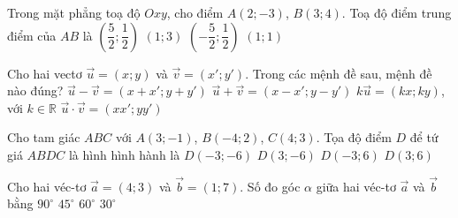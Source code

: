 \begin{ex}%
	Trong mặt phẳng toạ độ $Oxy$, cho điểm $A(2;-3)$, $B(3;4)$. Toạ độ điểm trung điểm của $AB$ là
	\choice
	{\True $\left(\dfrac{5}{2};\dfrac{1}{2}\right)$}
	{$(1;3)$}
	{$\left(-\dfrac{5}{2};\dfrac{1}{2}\right)$}
	{$(1;1)$}
\end{ex}
\begin{ex}
	Cho hai vectơ $\vec{u}=(x;y)$ và $\vec{v}=(x';y')$. Trong các mệnh đề sau, mệnh đề nào đúng?
	\choice
	{$\vec{u}-\vec{v}=(x+x';y+y')$}
	{$\vec{u}+\vec{v}=(x-x';y-y')$}
	{\True $k\vec{u}=(kx;ky)$, với $k\in\mathbb{R}$}
	{$\vec{u}\cdot \vec{v}=(xx';yy')$}
\end{ex}
\begin{ex}%
	Cho tam giác $ABC$ với $A(3;-1)$, $B(-4;2)$, $C(4;3)$. Tọa độ điểm $D$ để tứ giá $ABDC$ là hình hình hành là
	\choice
	{$D(-3;-6)$}
	{$D(3;-6)$}
	{\True $D(-3;6)$}
	{$D(3;6)$}
\end{ex}

\begin{ex}%
	Cho hai véc-tơ $\overrightarrow{a}=\left( 4;3 \right)$ và $\overrightarrow{b}=\left( 1;7 \right)$. Số đo góc $\alpha $ giữa hai véc-tơ $\overrightarrow{a}$ và $\overrightarrow{b}$ bằng
	\choice
	{$90^{\circ}$}
	{\True $45^{\circ}$}
	{$60^{\circ}$}
	{$30^{\circ}$}
\end{ex}

